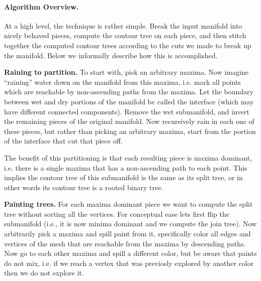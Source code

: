 \documentclass[11pt]{article}
\theoremstyle{definition}
\begin{document}
\paragraph{Algorithm Overview.}
At a high level, the technique is rather simple.  Break the input manifold into nicely 
behaved pieces, compute the contour tree on each piece, and then stitch together the computed 
contour trees according to the cuts we made to break up the manifold.  Below we informally 
describe how this is accomplished.
\begin{compactitem}
 \item {\bf Raining to partition.}  To start with, pick an arbitrary maxima.  Now imagine 
 ``raining'' water down on the manifold from this maxima, i.e. mark all points which are reachable 
 by non-ascending paths from the maxima.  Let the boundary between wet and dry portions of the 
 manifold be called the interface (which may have different connected components).  
 Remove the wet submanifold, and invert the remaining pieces
 of the original manifold.  Now recursively rain in each one of these pieces, but rather than 
 picking an arbitrary maxima, start from the portion of the interface that cut that piece off.
 
 The benefit of this partitioning is that each resulting piece 
 is maxima dominant, i.e. there is a single maxima that has a non-ascending path to each point.  
 This implies the contour tree of this submanifold is the same as its split tree, or in other words 
 its contour tree is a rooted binary tree. 
 
 \item {\bf Painting trees.}  For each maxima dominant piece we want to compute the split 
 tree without sorting all the vertices.  For conceptual ease lets first flip the submanifold 
 (i.e., it is now minima dominant and we compute the join tree).  Now arbitrarily pick a maxima 
 and spill paint from it, specifically color all edges and vertices of the mesh that are reachable 
 from the maxima by descending paths.  Now go to each other maxima and spill a different color, 
 but be aware that paints do not mix, i.e. if we reach a vertex that was previosly explored 
 by another color then we do not explore it.
 

\end{compactitem}
\end{document}
